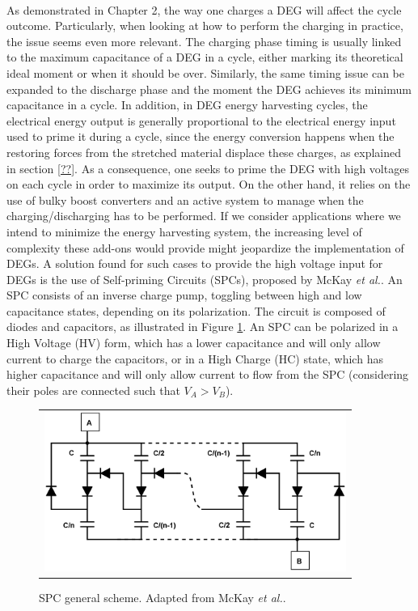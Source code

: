 \paragraph{} As demonstrated in Chapter 2, the way one charges a DEG will affect the cycle outcome. Particularly, when looking at how to perform the charging in practice, the issue seems even more relevant. The charging phase timing is usually linked to the maximum capacitance of a DEG in a cycle, either marking its theoretical ideal moment\cite{??} or when it should be over\cite{}. Similarly, the same timing issue can be expanded to the discharge phase and the moment the DEG achieves its minimum capacitance in a cycle. In addition, in DEG energy harvesting cycles, the electrical energy output is generally proportional to the electrical energy input used to prime it during a cycle, since the energy conversion happens when the restoring forces from the stretched material displace these charges, as explained in section \ref{??}. As a consequence, one seeks to prime the DEG with high voltages on each cycle in order to maximize its output. On the other hand, it relies on the use of bulky boost converters and an active system to manage when the charging/discharging has to be performed. If we consider applications where we intend to minimize the energy harvesting system, the increasing level of complexity these add-ons would provide might jeopardize the implementation of DEGs.
A solution found for such cases to provide the high voltage input for DEGs is the use of Self-priming Circuits (SPCs), proposed by McKay \textit{et al.}\cite{spc1}. An SPC consists of an inverse charge pump, toggling between high and low capacitance states, depending on its polarization. The circuit is composed of diodes and capacitors, as illustrated in Figure \ref{fig:spc}.  An SPC can be polarized in a High Voltage (HV) form, which has a lower capacitance and will only allow current to charge the capacitors, or in a High Charge (HC) state, which has higher capacitance and will only allow current to flow from the SPC (considering their poles are connected such that $V_A > V_B$).

\begin{figure}[ht]
\begin{center}
\begin{tabular}{c}
\includegraphics[height=5.2cm]{fig03/SPC_general.png}
\end{tabular}
\end{center}
\caption 
{ \label{fig:spc}
SPC general scheme. Adapted from McKay \textit{et al.}\cite{SPCdesign}. } 
\end{figure} 

